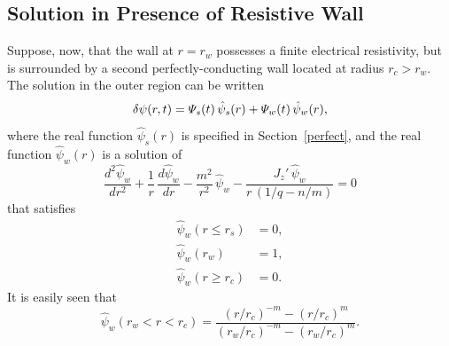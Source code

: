 \documentclass[notitlepage,12pt]{article}
\begin{document}
\subsection{Solution in Presence of Resistive Wall}\label{resistive}
Suppose, now, that the wall at $r=r_w$ possesses a finite electrical resistivity, but is surrounded by a second perfectly-conducting wall
located at radius $r_c>r_w$.
The solution in the outer region can be written
\begin{equation}\label{e111}
\delta\psi(r,t) = {\mit\Psi}_s(t)\,\hat{\psi}_s(r) + {\mit\Psi}_w(t)\,\hat{\psi}_w(r),
\end{equation}
where the real function $\hat{\psi}_s(r)$ is specified in Section~\ref{perfect}, and the real function  $\hat{\psi}_w(r)$ is a solution of 
\begin{equation}\label{e100a}
\frac{d^2\hat{\psi}_w}{dr^2} + \frac{1}{r}\,\frac{d\hat{\psi}_w}{dr}-\frac{m^2}{r^2}\,\hat{\psi}_w - \frac{J_z'\,\hat{\psi}_w}{r\,(1/q-n/m)}= 0
\end{equation}
that satisfies
\begin{align}\label{e101a}
\hat{\psi}_w(r\leq r_s) &= 0,\\[0.5ex]
\hat{\psi}_w(r_w) &= 1,\label{e102a}\\[0.5ex]
\hat{\psi}_w(r\geq r_c) &= 0.\label{e103a}
\end{align}
It is easily seen that
\begin{equation}\label{e117}
\hat{\psi}_w(r_w< r < r_c) = \frac{(r/r_c)^{-m} - (r/r_c)^m}{(r_w/r_c)^{-m} - (r_w/r_c)^m}.
\end{equation}
\end{document}
